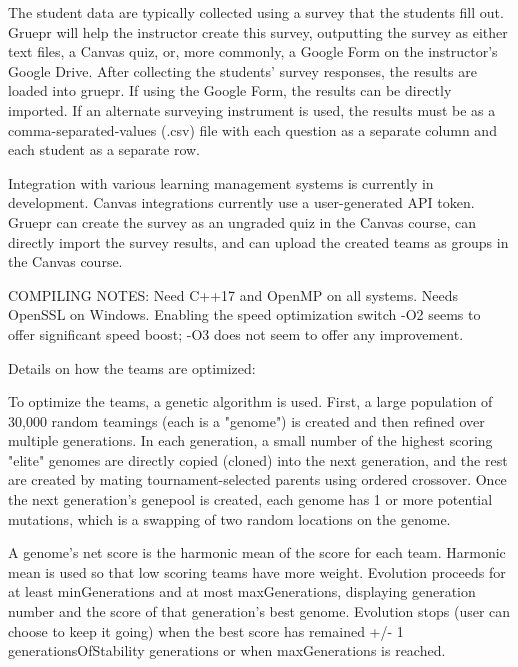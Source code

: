 \begin{DoxyVerb}
 The student data are typically collected using a survey that the students fill out. Gruepr will help
 the instructor create this survey, outputting the survey as either text files, a Canvas quiz, or, more
 commonly, a Google Form on the instructor's Google Drive. After collecting the students' survey
 responses, the results are loaded into gruepr. If using the Google Form, the results can be directly
 imported. If an alternate surveying instrument is used, the results must be as a comma-separated-values
 (.csv) file with each question as a separate column and each student as a separate row.

 Integration with various learning management systems is currently in development. Canvas integrations
 currently use a user-generated API token. Gruepr can create the survey as an ungraded quiz in the
 Canvas course, can directly import the survey results, and can upload the created teams as groups in
 the Canvas course.

 COMPILING NOTES: Need C++17 and OpenMP on all systems. Needs OpenSSL on Windows. Enabling the speed
 optimization switch -O2 seems to offer significant speed boost; -O3 does not seem to offer any
 improvement.
\end{DoxyVerb}
 Details on how the teams are optimized\+: \begin{DoxyVerb} To optimize the teams, a genetic algorithm is used. First, a large population of 30,000 random teamings
 (each is a "genome") is created and then refined over multiple generations. In each generation, a small
 number of the highest scoring "elite" genomes are directly copied (cloned) into the next generation,
 and the rest are created by mating tournament-selected parents using ordered crossover. Once the next
 generation's genepool is created, each genome has 1 or more potential mutations, which is a swapping of
 two random locations on the genome.

 A genome's net score is the harmonic mean of the score for each team. Harmonic mean is used so that low
 scoring teams have more weight. Evolution proceeds for at least minGenerations and at most
 maxGenerations, displaying generation number and the score of that generation's best genome. Evolution
 stops (user can choose to keep it going) when the best score has remained +/- 1%
 generationsOfStability generations or when maxGenerations is reached.
\end{DoxyVerb}


